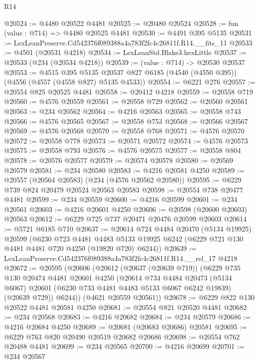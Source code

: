 \begin{lexlean}{R14}
\begin{coremodule}
@20524 := @4480 @20522 @4481
@20525 := @20480 @20524
@20528 := fun (value : @714) => @4480 @20525 @4481
@20530 := @4491 @395 @5135
@20531 := LexLeanPreserve.Cd542376f089388a4a783f2fc4c26811f.R14.__fits_11
@20533 := @4501 (@20531 @4218)
@20534 := LexLeanStd.Blake3.hexLittle
@20537 := @20533 (@234 (@20534 @4218))
@20539 := (value : @714) -> @20530 @20537
@20553 := @4515
    @395
    @5135
    @20537
    @827
    @6185
    (@4540 (@4550 @395))
    (@4556 (@4557 (@4558 @827) @5135 @4533))
@20554 := @6221 @276
@20557 := @20554 @825 @20525 @4481
@20558 := @20412 @4218
@20559 := @20558 @719
@20560 := @4576 @20559
@20561 := @20558 @729
@20562 := @20560 @20561
@20563 := @234 @20562
@20564 := @4216 @20563
@20565 := @20558 @743
@20566 := @4576 @20565
@20567 := @20558 @753
@20568 := @20566 @20567
@20569 := @4576 @20568
@20570 := @20558 @768
@20571 := @4576 @20570
@20572 := @20558 @778
@20573 := @20571 @20572
@20574 := @4576 @20573
@20575 := @20558 @793
@20576 := @4576 @20575
@20577 := @20558 @804
@20578 := @20576 @20577
@20579 := @20574 @20578
@20580 := @20569 @20579
@20581 := @234 @20580
@20583 := @4216 @20581 @4250
@20589 := @20557 (@20564 @20583) (@234 (@4576 @20562 @20580))
@20595 := @6229 @739 @824 @20479 @20524 @20563 @20583
@20598 := @20554 @738 @20477 @4481
@20599 := @234 @20559
@20600 := @4216 @20599
@20601 := @234 @20561
@20603 := @4216 @20601 @4250
@20606 := @20598 (@20600 @20603) @20563
@20612 := @6229 @725 @737 @20471 @20476 @20599 @20603
@20614 := @5721 @6185 @710
@20637 := @20614
    @724
    @4484
    @20470
    (@5134 @19925)
    @20599
    (@6230
      @723
      @4481
      @4483
      @5133
      @19925
      @6242
      (@6229 @721 @130 @4481 @4481 @720 @4250 (@19820 @720) @6244))
@20639 := LexLeanPreserve.Cd542376f089388a4a783f2fc4c26811f.R14.__rel_17 @4218
@20672 := @20595
    (@20606
      (@20612
        (@20637 (@20639 @719))
        (@6229
          @735
          @130
          @20474
          @4481
          @20601
          @4250
          (@20614
            @734
            @4484
            @20473
            (@5134 @6067)
            @20601
            (@6230 @733 @4481 @4483 @5133 @6067 @6242 @19839)
            (@20639 @729))
          @6244))
      (@4621 @20559 @20561))
@20678 := @6229 @822 @130 @20522 @4481 @20581 @4250
@20681 := @20554 @821 @20520 @4481
@20682 := @234 @20568
@20683 := @4216 @20682
@20684 := @234 @20579
@20686 := @4216 @20684 @4250
@20689 := @20681 (@20683 @20686) @20581
@20695 := @6229 @763 @820 @20490 @20519 @20682 @20686
@20698 := @20554 @762 @20488 @4481
@20699 := @234 @20565
@20700 := @4216 @20699
@20701 := @234 @20567

\end{coremodule}
\end{lexlean}
